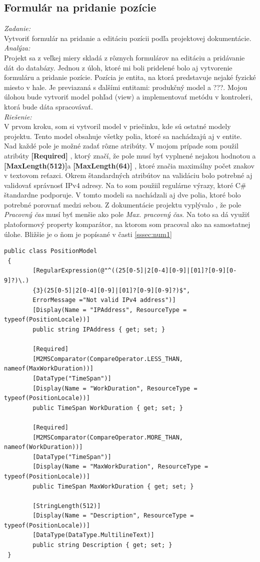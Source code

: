\documentclass[11pt, oneside]{report}
\begin{document}
\subsection{Formulár na pridanie pozície}
\textit{Zadanie:}\\
Vytvoriť formulár na pridanie a editáciu pozícii podľa projektovej dokumentácie.
\\\textit{Analýza:}\\
Projekt sa z veľkej miery skladá z rôznych formulárov na editáciu a pridávanie  dát do databázy. Jednou z úloh, ktoré mi boli pridelené bolo aj vytvorenie formuláru a pridanie pozície. Pozícia je entita, na ktorá  predstavuje nejaké  fyzické miesto  v hale. Je previazaná s ďalšími entitami: produkčný model a ???. Mojou úlohou bude  vytvoriť model pohľad (view) a  implementovať  metódu v kontroleri, ktorá bude dáta  spracovávať. 
\\\textit{Riešenie:}\\
V prvom kroku, som si vytvoril model v priečinku, kde sú ostatné modely projektu. Tento model obsahuje  všetky polia, ktoré sa nachádzajú aj v entite. Nad každé pole je možné zadať rôzne atribúty. V mojom prípade som použil atribúty \textbf{[Required]} , ktorý značí, že pole  musí byť vyplnené nejakou hodnotou a \textbf{[MaxLength(512)]}a \textbf{[MaxLength(64)]} , ktoré značia maximálny počet znakov v textovom reťazci. Okrem štandardných atribútov na validáciu bolo potrebné aj validovať  správnosť IPv4 adresy. Na to som použiil regulárne výrazy, ktoré C\# štandardne podporuje. V tomto modeli sa nachádzali aj dve polia, ktoré bolo potrebné porovnať medzi sebou. Z dokumentácie projektu vyplývalo , že pole \textit{Pracovný čas} musí byť menšie ako pole \textit{Max. pracovný čas}. Na toto sa  dá využiť platoformový property komparátor, na ktorom som pracoval ako na samostatnej úlohe. Bližšie je o ňom  je popísané v časti \ref{sssec:num1}
\lstset{language=C++}
\begin{lstlisting}[showstringspaces=false, caption= Časť modelu pozície s validačnými atribútmi,captionpos=b]
 public class PositionModel
 {        
        [RegularExpression(@"^((25[0-5]|2[0-4][0-9]|[01]?[0-9][0-9]?)\.)
        {3}(25[0-5]|2[0-4][0-9]|[01]?[0-9][0-9]?)$", 
        ErrorMessage ="Not valid IPv4 address")]
        [Display(Name = "IPAddress", ResourceType = typeof(PositionLocale))]
        public string IPAddress { get; set; }

        [Required]
        [M2MSComparator(CompareOperator.LESS_THAN, nameof(MaxWorkDuration))]
        [DataType("TimeSpan")]
        [Display(Name = "WorkDuration", ResourceType = typeof(PositionLocale))]
        public TimeSpan WorkDuration { get; set; }

        [Required]
        [M2MSComparator(CompareOperator.MORE_THAN, nameof(WorkDuration))]
        [DataType("TimeSpan")]
        [Display(Name = "MaxWorkDuration", ResourceType = typeof(PositionLocale))]
        public TimeSpan MaxWorkDuration { get; set; }
        
        [StringLength(512)]
        [Display(Name = "Description", ResourceType = typeof(PositionLocale))]
        [DataType(DataType.MultilineText)]
        public string Description { get; set; }        
 }
\end{lstlisting}
\end{document}
